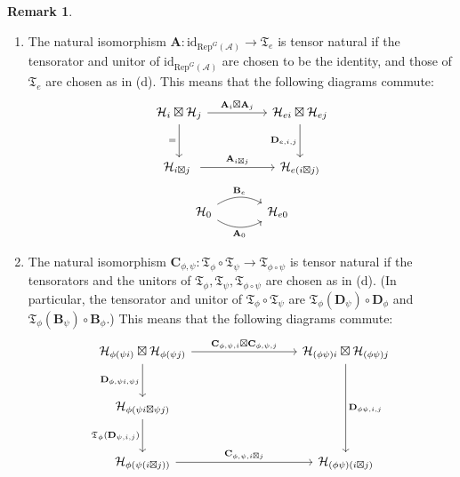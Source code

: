 \documentclass[11pt,b5paper,notitlepage]{article}
\theoremstyle{definition}
\newtheorem{rem}[df]{Remark}
\theoremstyle{plain}
\newcommand{\fk}{\mathfrak}
\newcommand{\id}{\mathrm{id}}
\newcommand{\RepGA}{\mathrm{Rep}^G(\mathcal A)}
\newcommand{\mbf}{\mathbf}
\newcommand{\MH}{\mathcal H}
\numberwithin{equation}{section}
\begin{document}
\begin{rem}
\begin{enumerate}[label=(\alph*)]
\begin{subequations}
\begin{gather}
\begin{tikzcd}[column sep=huge,row sep=large,ampersand replacement=\&]
\end{tikzcd}\label{eq12d}
\end{gather}
\end{subequations}
\item The natural isomorphism $\mbf A:\id_{\RepGA}\rightarrow\fk T_e$ is tensor natural if the tensorator and unitor of $\id_{\RepGA}$ are chosen to be the identity, and those of $\fk T_e$ are chosen as in (d). This means that the following diagrams commute:
\begin{subequations}\label{eq73}
\begin{gather}
\begin{tikzcd}[column sep=huge,row sep=large,ampersand replacement=\&]
\MH_i\boxtimes\MH_j \arrow[r,"\mbf A_i\boxtimes\mbf A_j"] \arrow[d,"="'] \& \MH_{ei}\boxtimes\MH_{ej}\arrow[d,"\mbf D_{e,i,j}"']  \\
\MH_{i\boxtimes j}\  \arrow[r,"\mbf A_{i\boxtimes j}"]           \& \MH_{e(i\boxtimes j)}        
\end{tikzcd}\label{eq73a}\\
\begin{tikzcd}[column sep=large,ampersand replacement=\&]
\MH_0 \arrow[r, bend left,"\mbf B_e"]\arrow[r, bend right,"\mbf A_0"'] \& \MH_{e0} 
\end{tikzcd}\label{eq73b}
\end{gather}
\end{subequations}
\item The natural isomorphism $\mbf C_{\phi,\psi}:\fk T_\phi\circ\fk T_\psi\rightarrow\fk T_{\phi\circ\psi}$ is tensor natural if the tensorators and the unitors of $\fk T_\phi,\fk T_\psi,\fk T_{\phi\circ\psi}$ are chosen as in (d). (In particular, the tensorator and unitor of $\fk T_\phi\circ\fk T_\psi$ are $\fk T_\phi(\mbf D_\psi)\circ\mbf D_\phi$ and $\fk T_\phi(\mbf B_\psi)\circ\mbf B_\phi$.) This means that the following diagrams commute:
\begin{subequations}\label{eq72}
\begin{gather}
\begin{tikzcd}[column sep=3cm,row sep=large,ampersand replacement=\&]
\MH_{\phi(\psi i)} \boxtimes\MH_{\phi(\psi j)}\arrow[r,"\mbf C_{\phi,\psi,i}\boxtimes\mbf C_{\phi,\psi,j}"] \arrow[d,"\mbf D_{\phi,\psi i,\psi j}"'] \& \MH_{(\phi\psi) i} \boxtimes\MH_{(\phi\psi)j}\arrow[dd,"\mbf D_{\phi\psi,i,j}"] \\
\MH_{\phi(\psi i\boxtimes\psi j)}\arrow[d,"\fk T_\phi(\mbf D_{\psi,i,j})"']\&\\
\MH_{\phi(\psi(i\boxtimes j))} \arrow[r,"\mbf C_{\phi,\psi,i\boxtimes j}"]           \& \MH_{(\phi\psi)(i\boxtimes j)}        

\end{tikzcd}
\end{gather}
\end{subequations}
\end{enumerate}
\end{rem}
\end{document}
